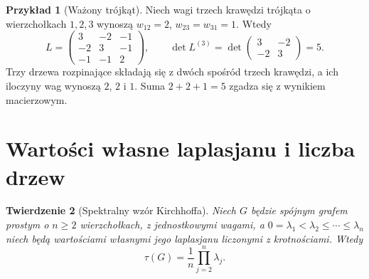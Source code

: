 \documentclass[11pt,a4paper]{report}
\numberwithin{equation}{section}
\theoremstyle{plain}
\newtheorem{twierdzenie}{Twierdzenie}[section]
\theoremstyle{definition}
\newtheorem{przyklad}[twierdzenie]{Przykład}
\theoremstyle{remark}
\begin{document}
\begin{przyklad}[Ważony trójkąt]
Niech wagi trzech krawędzi trójkąta o wierzchołkach
$1,2,3$ wynoszą $w_{12}=2$, $w_{23}=w_{31}=1$.
Wtedy
\[
L=\begin{pmatrix}3&-2&-1\\-2&3&-1\\-1&-1&2\end{pmatrix},
\qquad
\det L^{(3)}=\det\begin{pmatrix}3&-2\\-2&3\end{pmatrix}=5.
\]
Trzy drzewa rozpinające składają się z dwóch spośród
trzech krawędzi, a ich iloczyny wag wynoszą $2$, $2$
i $1$. Suma $2+2+1=5$ zgadza się z wynikiem macierzowym.
\end{przyklad}

\begin{center}
\end{center}

\section{Wartości własne laplasjanu i liczba drzew}
\label{sec:tg-spectrum-tree}

\begin{twierdzenie}[Spektralny wzór Kirchhoffa]
\label{thm:tg-spectral-tree}
Niech $G$ będzie spójnym grafem prostym o $n\ge2$
wierzchołkach, z jednostkowymi wagami, a
$0=\lambda_1<\lambda_2\le\cdots\le\lambda_n$
niech będą wartościami własnymi jego laplasjanu
liczonymi z krotnościami. Wtedy
\[
\tau(G)=\frac1n\prod_{j=2}^n\lambda_j.
\]
\end{twierdzenie}
\end{document}
